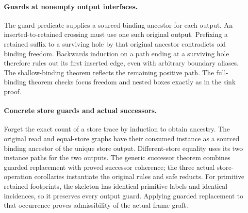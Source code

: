 \paragraph{Guards at nonempty output interfaces.}
The guard predicate supplies a sourced binding ancestor for each output.
An inserted-to-retained crossing must use one such original output. Prefixing
a retained suffix to a surviving hole by that original ancestor contradicts
old binding freedom. Backwards induction on a path ending at a surviving hole
therefore rules out its first inserted edge, even with arbitrary boundary
aliases. The shallow-binding theorem reflects the remaining positive path.
The full-binding theorem checks focus freedom and nested boxes exactly as in
the sink proof.

\par{}

\paragraph{Concrete store guards and actual successors.}
Forget the exact count of a store trace by induction to obtain ancestry.
The original read and equal-store graphs have their consumed instance as a
sourced binding ancestor of the unique store output. Different-store equality
uses its two instance paths for the two outputs. The generic successor theorem
combines guarded replacement with proved successor coherence; the three actual
store-operation corollaries instantiate the original rules and safe reducts.
For primitive retained footprints, the skeleton has identical primitive labels
and identical incidences, so it preserves every output guard. Applying guarded
replacement to that occurrence proves admissibility of the actual frame graft.

\par{}
\par{}

